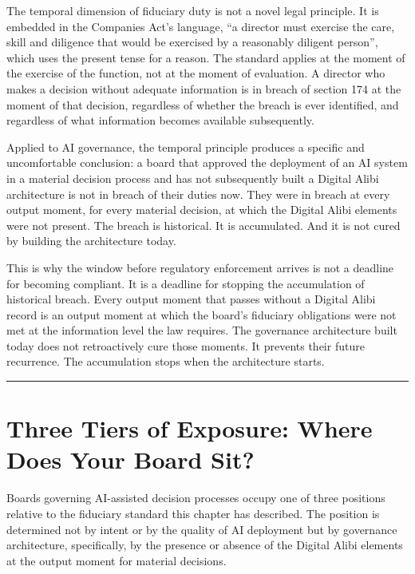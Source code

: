 The temporal dimension of fiduciary duty is not a novel legal principle. It is embedded in the Companies Act's language, ``a director must exercise the care, skill and diligence that would be exercised by a reasonably diligent person'', which uses the present tense for a reason. The standard applies at the moment of the exercise of the function, not at the moment of evaluation. A director who makes a decision without adequate information is in breach of section 174 at the moment of that decision, regardless of whether the breach is ever identified, and regardless of what information becomes available subsequently.

Applied to AI governance, the temporal principle produces a specific and uncomfortable conclusion: a board that approved the deployment of an AI system in a material decision process and has not subsequently built a Digital Alibi architecture is not in breach of their duties now. They were in breach at every output moment, for every material decision, at which the Digital Alibi elements were not present. The breach is historical. It is accumulated. And it is not cured by building the architecture today.

This is why the window before regulatory enforcement arrives is not a deadline for becoming compliant. It is a deadline for stopping the accumulation of historical breach. Every output moment that passes without a Digital Alibi record is an output moment at which the board's fiduciary obligations were not met at the information level the law requires. The governance architecture built today does not retroactively cure those moments. It prevents their future recurrence. The accumulation stops when the architecture starts.

\begin{center}\rule{0.5\linewidth}{0.5pt}\end{center}

\section{Three Tiers of Exposure: Where Does Your Board Sit?}

Boards governing AI-assisted decision processes occupy one of three positions relative to the fiduciary standard this chapter has described. The position is determined not by intent or by the quality of AI deployment but by governance architecture, specifically, by the presence or absence of the Digital Alibi elements at the output moment for material decisions.

